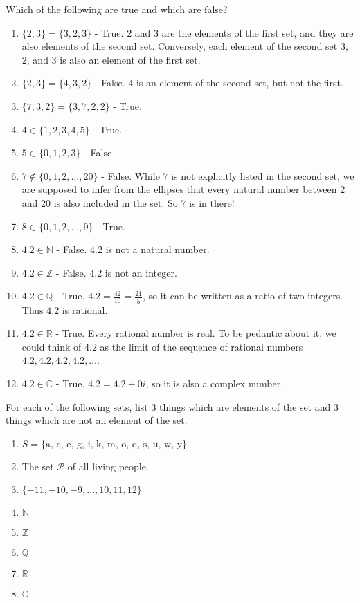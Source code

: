 \begin{solutions}
	Which of the following are true and which are false?
	
	\begin{enumerate}
		\item $\{2,3\} = \{3, 2,3\}$ - True.  $2$ and $3$ are the elements of the first set, and they are also elements of the second set.  Conversely, each element of the second set $3$,  $2$, and $3$ is also an element of the first set. 
		\item $\{2,3\} = \{4,3,2\}$  - False.  $4$ is an element of the second set, but not the first.
		\item $\{7,3,2\} = \{3,7,2,2\}$ - True.
		\item $4 \in \{1,2,3,4,5\}$ - True.
		\item $5 \in \{0,1,2,3\}$ - False
		\item $7 \notin \{0,1,2, \dots, 20\}$ - False.  While $7$ is not explicitly listed in the second set, we are supposed to infer from the ellipses that every natural number between $2$ and $20$ is also included in the set.  So $7$ is in there!
		\item $8 \in \{0,1,2, \dots,  9\}$ - True.
		\item $4.2 \in \mathbb{N}$ - False.  $4.2$ is not a natural number.
		\item $4.2 \in \mathbb{Z}$ - False.  $4.2$ is not an integer.
		\item $4.2 \in \mathbb{Q}$ - True.  $4.2 = \frac{42}{10} = \frac{21}{5}$, so it can be written as a ratio of two integers.  Thus $4.2$ is rational.
		\item $4.2 \in \mathbb{R}$ - True.  Every rational number is real.  To be pedantic about it, we could think of $4.2$ as the limit of the sequence of rational numbers $4.2, 4.2, 4.2, 4.2, \dots$.
		\item $4.2 \in \mathbb{C}$ - True.  $4.2 = 4.2+0i$, so it is also a complex number.
	\end{enumerate}
\end{solutions}

\begin{xca}
		For each of the following sets, list $3$ things which are elements of the set and $3$ things which are not an element of the set.
		
		\begin{enumerate}
				\item $S = \{\textrm{a, c, e, g, i, k, m, o, q, s, u, w, y}\}$
				\item The set $\mathcal{P}$ of all living people.
				\item  $\{-11,-10, -9,  \dots, 10, 11, 12\}$
				\item $\mathbb{N}$
				\item $\mathbb{Z}$
				\item $\mathbb{Q}$
				\item $\mathbb{R}$
				\item $\mathbb{C}$
			\end{enumerate}
	\end{xca}

